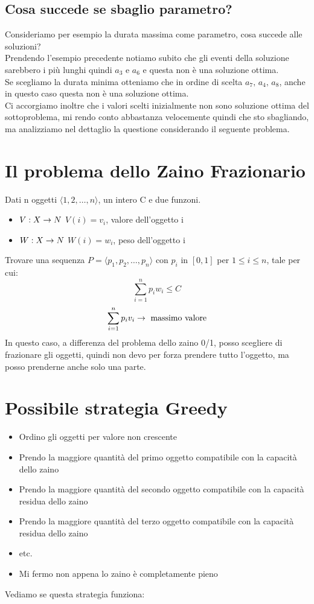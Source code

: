 \subsection{Cosa succede se sbaglio parametro?}
Consideriamo per esempio la durata massima come parametro, cosa succede alle soluzioni?\\
Prendendo l'esempio precedente notiamo subito che gli eventi della soluzione sarebbero i più
lunghi quindi $a_3$ e $a_6$ e questa non è una soluzione ottima.\\
Se scegliamo la durata minima otteniamo che in ordine di scelta $a_7,\, a_4,\, a_8$,
anche in questo caso questa non è una soluzione ottima.\\
Ci accorgiamo inoltre che i valori scelti inizialmente non sono soluzione ottima del sottoproblema,
mi rendo conto abbastanza velocemente quindi che sto sbagliando, ma analizziamo nel dettaglio
la questione considerando il seguente problema. 
\section{Il problema dello Zaino Frazionario}
Dati n oggetti $\langle 1,2,\dots,n \rangle$, un intero C e due funzoni.
\begin{itemize}
    \item $V:X \rightarrow N$   $V(i) = v_i$, valore dell'oggetto i
    \item $W:X \rightarrow N$   $W(i) = w_i$, peso dell'oggetto i
\end{itemize}
Trovare una sequenza $P = \langle p_1, p_2, \dots, p_n \rangle$ con $p_i$ in $[0,1]$ per
$1 \leq i \leq n$, tale per cui:
\[ \sum^n_{i=1}p_i w_i \leq C \]
\[ \sum^n_{i=1}p_i v_i \rightarrow \text{ massimo valore} \]
In questo caso, a differenza del problema dello zaino 0/1, posso scegliere di frazionare gli oggetti,
quindi non devo per forza prendere tutto l'oggetto, ma posso prenderne anche solo una parte.
\section{Possibile strategia Greedy}
\begin{itemize}
    \item Ordino gli oggetti per valore non crescente
    \item Prendo la maggiore quantità del primo oggetto compatibile con la capacità dello zaino
    \item Prendo la maggiore quantità del secondo oggetto compatibile con la capacità residua dello zaino
    \item Prendo la maggiore quantità del terzo oggetto compatibile con la capacità residua dello zaino
    \item etc.
    \item Mi fermo non appena lo zaino è completamente pieno
\end{itemize}
Vediamo se questa strategia funziona:

